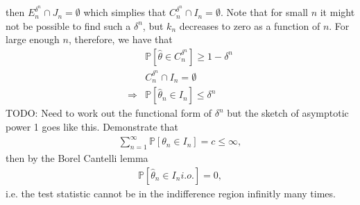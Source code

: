 \documentclass[11pt]{article}
\begin{document}
then $E_n^{\delta^n} \cap J_n = \emptyset$ which simplies that $C_n^{\delta^n} \cap I_n = \emptyset$. Note that for small $n$ it might not be possible to find such a $\delta^n$, but $k_n$ decreases to zero as a function of $n$. For large enough $n$, therefore, we have that
\begin{align*}
  &\mathbb{P}[\hat{\theta} \in C_n^{\delta^n}] \geq 1-\delta^n\\
  &C_n^{\delta^n} \cap I_n = \emptyset\\
  \Rightarrow &\mathbb{P}[\hat{\theta}_n \in I_n] \leq \delta^n
\end{align*}
TODO: Need to work out the functional form of $\delta^n$ but the sketch of asymptotic power 1 goes like this. Demonstrate that
\begin{align*}
  \sum_{n=1}^{\infty}\mathbb{P}[\theta_n \in I_n] = c \leq \infty,
\end{align*}
then by the Borel Cantelli lemma
\begin{align*}
  \mathbb{P}[\hat{\theta}_n \in I_n i.o.] = 0,
\end{align*}
i.e. the test statistic cannot be in the indifference region infinitly many times.
\end{document}
